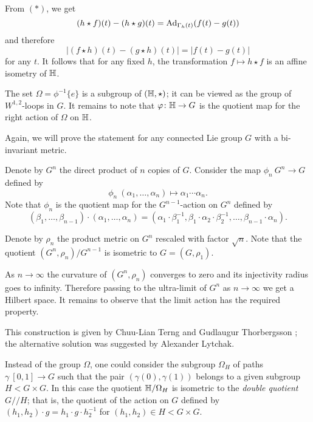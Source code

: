 From $({*})$, we get
\[(h\star f)(t)-(h\star g)(t)=\mathrm{Ad}_{\Gamma_h(t)}(f(t)-g(t))\]
and therefore
\[|(f\star h)(t)-(g\star h)(t)|=|f(t)-g(t)|\]
for any $t$.
It follows that for any fixed $h$,
the transformation $f\mapsto h\star f$ is an affine isometry of $\mathbb{H}$.


The set $\Omega=\phi^{-1}\{e\}$ is a subgroup of $(\mathbb{H},\star)$;
it can be viewed as the group of $W^{1,2}$-loops in $G$.
It remains to note that $\varphi\colon\mathbb{H}\to G$ is the quotient map for the right action of $\Omega$ on $\mathbb{H}$.
\qeds

 Again, we will prove the statement for any connected Lie group $G$ with a bi-invariant metric.

Denote by $G^n$ the direct product of $n$ copies of $G$.
Consider the map $\phi_n\:G^n\to G$ defined by
\[\phi_n\:(\alpha_1,\dots,\alpha_n)\mapsto \alpha_1\cdots\alpha_n.\]
Note that $\phi_n$ is the quotient map for the $G^{n-1}$-action on $G^n$ defined by
\[(\beta_1,\dots,\beta_{n-1})\cdot(\alpha_1,\dots,\alpha_n)=(\alpha_1\cdot\beta_1^{-1},\beta_1\cdot\alpha_2\cdot\beta_2^{-1},\dots,\beta_{n-1}\cdot\alpha_n).\]

Denote by $\rho_n$ the product metric on $G^n$ rescaled with factor $\sqrt{n}$.
Note that the quotient $(G^n,\rho_n)/G^{n-1}$ is isometric to $G=(G,\rho_1)$.

As $n\to\infty$ the curvature of $(G^n,\rho_n)$ converges to zero and its injectivity radius goes to infinity.
Therefore passing to the ultra-limit of $G^n$ as $n\to\infty$ we get a Hilbert space.
It remains to observe that the limit action has the required property.
\qeds

This construction is given by Chuu-Lian Terng and Gudlaugur Thorbergsson \cite[see section 4 in][]{terng-thorbergsson};
the alternative solution was suggested by Alexander Lytchak.

Instead of the group $\Omega$, 
one could consider the subgroup $\Omega_H$ of paths $\gamma\:[0,1]\to G$ such that the pair $(\gamma(0),\gamma(1))$ belongs to a given subgroup $H<G\times G$.
In this case the quotient $\mathbb{H}/\Omega_H$ is isometric to the \emph{double quotient} $G/\!\!/H$;
that is, the quotient of the action on $G$ defined by $(h_1,h_2)\cdot g=h_1\cdot g\cdot h_2^{-1}$ for $(h_1,h_2)\in H<G\times G$.
